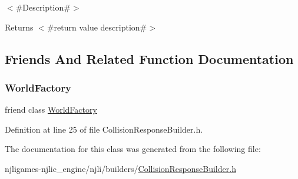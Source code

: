 $<$\#\+Description\#$>$

\begin{DoxyReturn}{Returns}
$<$\#return value description\#$>$ 
\end{DoxyReturn}


\subsection{Friends And Related Function Documentation}
\mbox{\label{classnjli_1_1_collision_response_builder_acb96ebb09abe8f2a37a915a842babfac}} 
\subsubsection{\texorpdfstring{World\+Factory}{WorldFactory}}
{\footnotesize\ttfamily friend class \mbox{\hyperlink{classnjli_1_1_world_factory}{World\+Factory}}\hspace{0.3cm}{\ttfamily [friend]}}



Definition at line 25 of file Collision\+Response\+Builder.\+h.



The documentation for this class was generated from the following file\+:\begin{DoxyCompactItemize}
\item 
njligames-\/njlic\+\_\+engine/njli/builders/\mbox{\hyperlink{_collision_response_builder_8h}{Collision\+Response\+Builder.\+h}}\end{DoxyCompactItemize}
